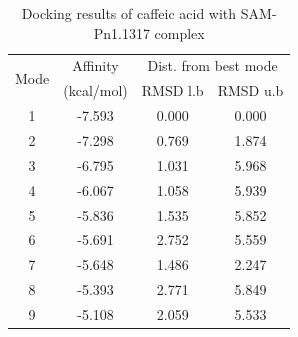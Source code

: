 \documentclass[12pt]{article}
\begin{document}
	\begin{table}[h]
		\centering
		\caption{Docking results of caffeic acid with SAM-Pn1.1317 complex}
		\label{table4_2}
		\begin{tabular}{cccc}
			\toprule
			\multirow{2}{*}{Mode} & Affinity & \multicolumn{2}{c}{Dist. from best mode}\\
			&  (kcal/mol) & RMSD l.b & RMSD u.b\\
			\midrule
			1 & -7.593   &   0.000   &   0.000\\
			2 & -7.298   &   0.769   &   1.874\\
			3 & -6.795   &   1.031   &   5.968\\
			4 & -6.067   &   1.058   &   5.939\\
			5 & -5.836   &   1.535   &   5.852\\
			6 & -5.691   &   2.752   &   5.559\\
			7 & -5.648   &   1.486   &   2.247\\
			8 & -5.393   &   2.771   &   5.849\\
			9 & -5.108   &   2.059   &   5.533\\
			\bottomrule
			
		\end{tabular}
	\end{table}
	
\end{document}
